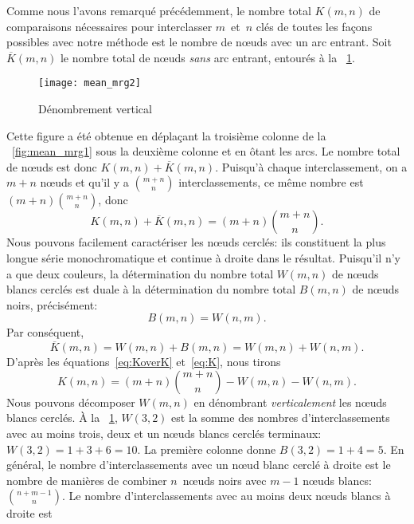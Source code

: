 Comme nous l'avons remarqué précédemment, le nombre total \(K(m,n)\)
de comparaisons nécessaires pour interclasser \(m\)~et~\(n\) clés de
toutes les façons possibles avec notre méthode est le nombre de
n{\oe}uds avec un arc entrant. Soit \(\overline{K}(m,n)\) le nombre
total de n{\oe}uds \emph{sans} arc entrant, entourés à la
\fig~\ref{fig:mean_mrg2}.
\begin{figure}
\centering
\texttt{[image: mean\_mrg2]}
\caption{Dénombrement vertical}
\label{fig:mean_mrg2}
\end{figure}
Cette figure a été obtenue en déplaçant la troisième colonne de la
\fig~\vref{fig:mean_mrg1} sous la deuxième colonne et en ôtant les
arcs. Le nombre total de n{\oe}uds est donc \(K(m,n) +
\overline{K}(m,n)\). Puisqu'à chaque interclassement, on a \(m+n\)
n{\oe}uds et qu'il y a \(\binom{m+n}{n}\) interclassements, ce même
nombre est \((m + n) \binom{m+n}{n}\), donc
\begin{equation}
K(m,n) + \overline{K}(m,n) = (m + n) \binom{m+n}{n}.
\label{eq:KoverK}
\end{equation}
Nous pouvons facilement caractériser les n{\oe}uds cerclés: ils
constituent la plus longue série monochromatique et continue à droite
dans le résultat. Puisqu'il n'y a que deux couleurs, la détermination
du nombre total \(W(m,n)\) de n{\oe}uds blancs cerclés est duale à la
détermination du nombre total \(B(m,n)\) de n{\oe}uds noirs,
précisément:
\begin{equation*}
B(m,n) = W(n,m).
\end{equation*}
Par conséquent,
\begin{equation}
\overline{K}(m,n) = W(m,n) + B(m,n) = W(m,n) + W(n,m).
\label{eq:K}
\end{equation}
D'après les équations~\eqref{eq:KoverK} et~\eqref{eq:K}, nous tirons
\begin{equation}
K(m,n) = (m + n) \binom{m+n}{n} - W(m,n) - W(n,m).
\label{eq:K_temp}
\end{equation}
Nous pouvons décomposer \(W(m,n)\) en dénombrant \emph{verticalement}
les n{\oe}uds blancs cerclés. À la \fig~\ref{fig:mean_mrg2},
\(W(3,2)\) est la somme des nombres d'interclassements avec au moins
trois, deux et un n{\oe}uds blancs cerclés terminaux: \(W(3,2) = 1+ 3
+ 6 = 10\). La première colonne donne \(B(3,2) = 1 + 4 = 5\). En
général, le nombre d'interclassements avec un n{\oe}ud blanc cerclé à
droite est le nombre de manières de combiner \(n\)~n{\oe}uds noirs
avec \(m-1\) n{\oe}uds blancs: \(\binom{n+m-1}{n}\). Le nombre
d'interclassements avec au moins deux n{\oe}uds blancs à droite est
